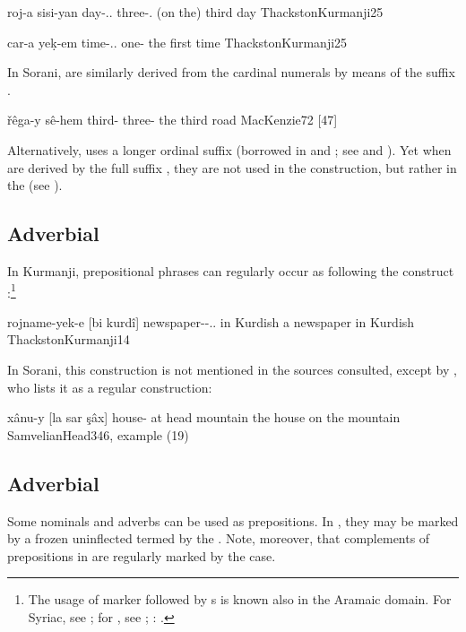 {roj-a sisi-yan}
{day-\ez..\fem{} three-\obl.\pl}
{(on the) third day}
{ThackstonKurmanji}{25}

{car-a yeḳ-em}
{time-\ez..\fem{} one-\ord}
{the first time}
{ThackstonKurmanji}{25}

 In Sorani,  are similarly derived from the cardinal numerals by means of the suffix  \citep[72--73]{MacKenzie}.

{řêga-y sê-hem}
{third-\ez{} three-\ord}
{the third road}
{MacKenzie}{72 {[47]}}

 Alternatively, \Sor uses a longer ordinal suffix  (borrowed in   \JUrm  and \JSan; see  and ). Yet when   are derived by the full suffix , they are not used in the \ez* construction, but rather in the  (see ).


\subsection{Adverbial \secns} \label{ss:cst_ez_adv_secn}

In Kurmanji, prepositional phrases can regularly occur as \secns following the construct \ez*:\footnote{The usage of \cst* marker followed by \PP s is known also in the Aramaic domain. For Syriac, see ; for \JZax, see ; \JUrm: .}

{rojname-yek-e [bi kurdî]}
{newspaper-\indef-\ez.\indef.\fem{} in Kurdish}
{a newspaper in Kurdish}
{ThackstonKurmanji}{14}

In Sorani, this construction is not mentioned in the sources consulted, except by  \citet[346]{SamvelianHead}, who lists it as a regular construction:

{xânu-y [la sar şâx]}
{house-\ez{} at head mountain}
{the house on the mountain}
{SamvelianHead}{346, example (19)}



\subsection{Adverbial  \prims} \label{ss:cst_ez_adv_prim}

Some nominals and adverbs can be used as prepositions. 
In \Kur, they may be marked by a frozen uninflected \ez* {} termed by \citet[200]{MacKenzie} the . Note, moreover, that complements of prepositions in \Kur are regularly marked by the \obl* case. 




